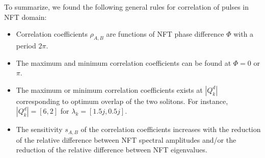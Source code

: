 \documentclass[9pt,twocolumn,twoside]{osajnl}
\begin{document}


To summarize, we found the following general rules for correlation of pulses in NFT domain:
\begin{itemize}[topsep=0pt,itemsep=0pt,partopsep=0pt,parsep=0pt]
    \item Correlation coefficients $\rho_{A,B}$ are functions of NFT phase difference $\Phi$ with a period $2\pi$.
    \item The maximum and minimum correlation coefficients can be found at $\Phi=0$ or $\pi$.
    \item The maximum or minimum correlation coefficients exists at $|Q^d_k|$ corresponding to optimum overlap of the two solitons. For instance, $|Q^d_k|=[6,2]$ for $\lambda_k=[1.5j,0.5j]$.
    \item The sensitivity $s_{A,B}$ of the correlation coefficients increases with the reduction of the relative difference between NFT spectral amplitudes and/or the reduction of the relative difference between NFT eigenvalues.
\end{itemize}
\end{document}

